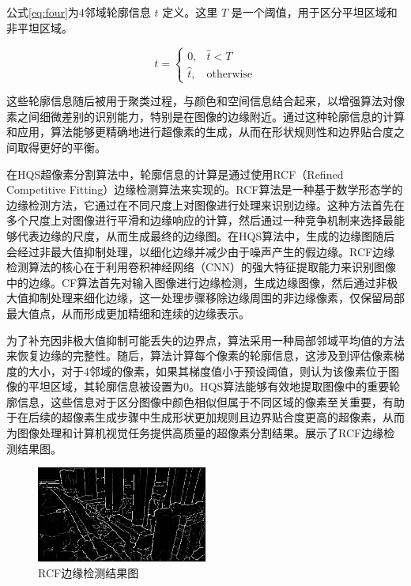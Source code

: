 公式\eqref{eq:four}为4邻域轮廓信息 \(t\) 定义。这里 \(T\) 是一个阈值，用于区分平坦区域和非平坦区域。

\begin{equation}
  t = \begin{cases}
    0, & \hat{t} < T \\
    \hat{t}, & \text{otherwise}
  \end{cases}
  \label{eq:four}
\end{equation}

这些轮廓信息随后被用于聚类过程，与颜色和空间信息结合起来，以增强算法对像素之间细微差别的识别能力，特别是在图像的边缘附近。通过这种轮廓信息的计算和应用，算法能够更精确地进行超像素的生成，从而在形状规则性和边界贴合度之间取得更好的平衡。

在HQS超像素分割算法中，轮廓信息的计算是通过使用RCF（Refined Competitive Fitting）边缘检测算法来实现的。RCF算法是一种基于数学形态学的边缘检测方法，它通过在不同尺度上对图像进行处理来识别边缘。这种方法首先在多个尺度上对图像进行平滑和边缘响应的计算，然后通过一种竞争机制来选择最能够代表边缘的尺度，从而生成最终的边缘图。在HQS算法中，生成的边缘图随后会经过非最大值抑制处理，以细化边缘并减少由于噪声产生的假边缘。RCF边缘检测算法的核心在于利用卷积神经网络（CNN）的强大特征提取能力来识别图像中的边缘。CF算法首先对输入图像进行边缘检测，生成边缘图像，然后通过非极大值抑制处理来细化边缘，这一处理步骤移除边缘周围的非边缘像素，仅保留局部最大值点，从而形成更加精细和连续的边缘表示。

为了补充因非极大值抑制可能丢失的边界点，算法采用一种局部邻域平均值的方法来恢复边缘的完整性。随后，算法计算每个像素的轮廓信息，这涉及到评估像素梯度的大小，对于4邻域的像素，如果其梯度值小于预设阈值，则认为该像素位于图像的平坦区域，其轮廓信息被设置为0。HQS算法能够有效地提取图像中的重要轮廓信息，这些信息对于区分图像中颜色相似但属于不同区域的像素至关重要，有助于在后续的超像素生成步骤中生成形状更加规则且边界贴合度更高的超像素，从而为图像处理和计算机视觉任务提供高质量的超像素分割结果。展示了RCF边缘检测结果图。

\begin{figure}[htbp]
	\centering
    \includegraphics[width=0.5\textwidth]{pic/rcf/2.png}
	\caption{RCF边缘检测结果图}
      \label{fig:RCF}
\end{figure}

